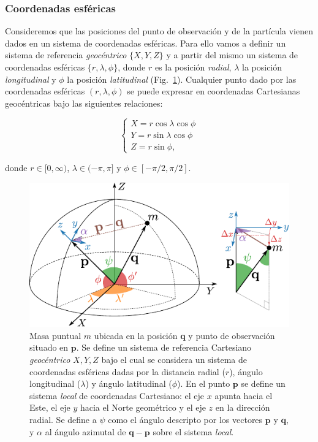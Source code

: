 \subsubsection{Coordenadas esféricas}

Consideremos que las posiciones del punto de observación y de la partícula
vienen dados en un sistema de coordenadas esféricas. Para ello vamos a definir
un sistema de referencia \emph{geocéntrico} $\{X, Y, Z\}$ y a partir del mismo
un sistema de coordenadas esféricas $\{r, \lambda, \phi\}$, donde $r$ es la
posición \emph{radial}, $\lambda$ la posición \emph{longitudinal} y $\phi$ la
posición \emph{latitudinal} (Fig.~\ref{fig:spherical-coordinates}).
Cualquier punto dado por las coordenadas esféricas $(r, \lambda, \phi)$ se
puede expresar en coordenadas Cartesianas geocéntricas bajo las siguientes
relaciones:

\begin{equation}
    \begin{cases}
        X = r \cos\lambda \cos{\phi} \\
        Y = r \sin\lambda \cos{\phi} \\
        Z = r \sin{\phi},
    \end{cases}
\end{equation}

\noindent donde $r \in [0, \infty)$, $\lambda \in (-\pi, \pi]$ y
$\phi \in [-\pi/2, \pi/2]$.

\begin{figure}[t]
    \centering
    \includegraphics[width=\linewidth]{figs/spherical-coordinates.pdf}
    \caption{
        Masa puntual $m$ ubicada en la posición $\mathbf{q}$ y punto de
        observación situado en $\mathbf{p}$.
        Se define un sistema de referencia Cartesiano \emph{geocéntrico} $X, Y,
        Z$ bajo el cual se considera un sistema de coordenadas esféricas dadas
        por la distancia radial ($r$), ángulo longitudinal ($\lambda$) y ángulo
        latitudinal ($\phi$).
        En el punto $\mathbf{p}$ se define un sistema \emph{local} de
        coordenadas Cartesiano: el eje $x$ apunta hacia el Este,
        el eje $y$ hacia el Norte geométrico y el eje $z$ en la dirección
        radial.
        Se define a $\psi$ como el ángulo descripto por los vectores
        $\mathbf{p}$ y $\mathbf{q}$, y $\alpha$ al ángulo azimutal de
        $\mathbf{q} - \mathbf{p}$ sobre el sistema \emph{local}.
    }
    \label{fig:spherical-coordinates}
\end{figure}


